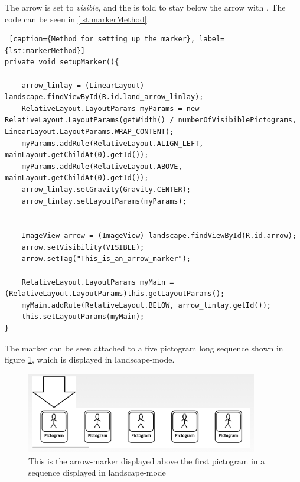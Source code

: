 The arrow is set to \textit{visible}, and the  is told to stay below the arrow with . The code can be seen in \ref{lst:markerMethod}.

\begin{lstlisting} [caption={Method for setting up the marker}, label={lst:markerMethod}]
private void setupMarker(){

    arrow_linlay = (LinearLayout) landscape.findViewById(R.id.land_arrow_linlay);
    RelativeLayout.LayoutParams myParams = new RelativeLayout.LayoutParams(getWidth() / numberOfVisibiblePictograms, LinearLayout.LayoutParams.WRAP_CONTENT);
    myParams.addRule(RelativeLayout.ALIGN_LEFT, mainLayout.getChildAt(0).getId());
    myParams.addRule(RelativeLayout.ABOVE, mainLayout.getChildAt(0).getId());
    arrow_linlay.setGravity(Gravity.CENTER);
    arrow_linlay.setLayoutParams(myParams);


    ImageView arrow = (ImageView) landscape.findViewById(R.id.arrow);
    arrow.setVisibility(VISIBLE);
    arrow.setTag("This_is_an_arrow_marker");

    RelativeLayout.LayoutParams myMain = (RelativeLayout.LayoutParams)this.getLayoutParams();
    myMain.addRule(RelativeLayout.BELOW, arrow_linlay.getId());
    this.setLayoutParams(myMain);
}
\end{lstlisting}

The marker can be seen attached to a five pictogram long sequence shown in figure \ref{fig:markerpic}, which is displayed in landscape-mode.
\begin{figure} [h!]
\centering
\includegraphics[width=0.9\textwidth]{Pics/Sprint3/landscape5picsCROP.png}
\caption{This is the arrow-marker displayed above the first pictogram in a sequence displayed in landscape-mode}
\label{fig:markerpic}
\end{figure}